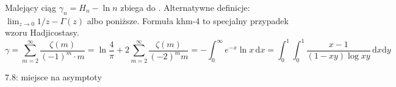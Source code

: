 

\renewcommand{\footrulewidth}{0.4pt}

	























Malejący ciąg $\gamma_n = H_n- \ln n$ zbiega do .
Alternatywne definicje: $\lim_{z \to 0} 1/z - \Gamma(z)$ albo poniższe.
Formuła khm-4 to specjalny przypadek wzoru Hadjicostasy.
\[
	\gamma = \sum_{m=2}^\infty \frac{\zeta(m)}{(-1)^m \cdot m} = 
	\ln \frac 4 \pi + 2 \sum_{m = 2}^\infty \frac{\zeta(m)}{(-2)^m m} = 
	-\int_0^\infty e^{-x} \ln x \, \textrm{d}{x} = 
	\int_0^1\int_0^1 \frac{x-1}{(1 - xy) \log xy}\, \textrm{d}x\textrm{d}y
\]


7.8: miejsce na asymptoty